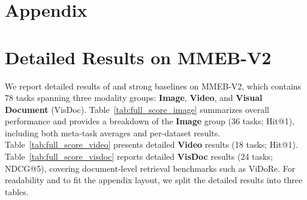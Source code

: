 
\clearpage


\section*{Appendix}

\section{Detailed Results on MMEB-V2}

We report detailed results of \ours{} and strong baselines on MMEB-V2, which contains 78 tasks spanning three modality groups: \textbf{Image}, \textbf{Video}, and \textbf{Visual Document} (VisDoc).
Table~\ref{tab:full_score_image} summarizes overall performance and provides a breakdown of the \textbf{Image} group (36 tasks; Hit@1), including both meta-task averages and per-dataset results.
Table~\ref{tab:full_score_video} presents detailed \textbf{Video} results (18 tasks; Hit@1).
Table~\ref{tab:full_score_visdoc} reports detailed \textbf{VisDoc} results (24 tasks; NDCG@5), covering document-level retrieval benchmarks such as ViDoRe.
For readability and to fit the appendix layout, we split the detailed results into three tables.






